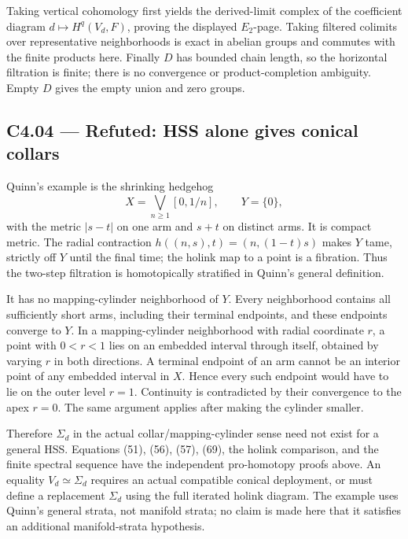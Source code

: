 Taking vertical cohomology first yields the derived-limit complex of the coefficient diagram \(d\mapsto H^q(V_d,F)\), proving the displayed \(E_2\)-page. Taking filtered colimits over representative neighborhoods is exact in abelian groups and commutes with the finite products here. Finally \(D\) has bounded chain length, so the horizontal filtration is finite; there is no convergence or product-completion ambiguity. Empty \(D\) gives the empty union and zero groups.

\subsection{C4.04 --- Refuted: HSS alone gives conical collars}\label{c4.04-refuted-hss-alone-gives-conical-collars}

Quinn's example \cite[p.452]{Quinn1988} is the shrinking hedgehog \[
 X=\bigvee_{n\ge1}[0,1/n],\qquad Y=\{0\},
\] with the metric \(|s-t|\) on one arm and \(s+t\) on distinct arms. It is compact metric. The radial contraction \(h((n,s),t)=(n,(1-t)s)\) makes \(Y\) tame, strictly off \(Y\) until the final time; the holink map to a point is a fibration. Thus the two-step filtration is homotopically stratified in Quinn's general definition.

It has no mapping-cylinder neighborhood of \(Y\). Every neighborhood contains all sufficiently short arms, including their terminal endpoints, and these endpoints converge to \(Y\). In a mapping-cylinder neighborhood with radial coordinate \(r\), a point with \(0<r<1\) lies on an embedded interval through itself, obtained by varying \(r\) in both directions. A terminal endpoint of an arm cannot be an interior point of any embedded interval in \(X\). Hence every such endpoint would have to lie on the outer level \(r=1\). Continuity is contradicted by their convergence to the apex \(r=0\). The same argument applies after making the cylinder smaller.

Therefore \(\Sigma_d\) in the actual collar/mapping-cylinder sense need not exist for a general HSS. Equations (51), (56), (57), (69), the holink comparison, and the finite spectral sequence have the independent pro-homotopy proofs above. An equality \(V_d\simeq\Sigma_d\) requires an actual compatible conical deployment, or must define a replacement \(\Sigma_d\) using the full iterated holink diagram. The example uses Quinn's general strata, not manifold strata; no claim is made here that it satisfies an additional manifold-strata hypothesis.


